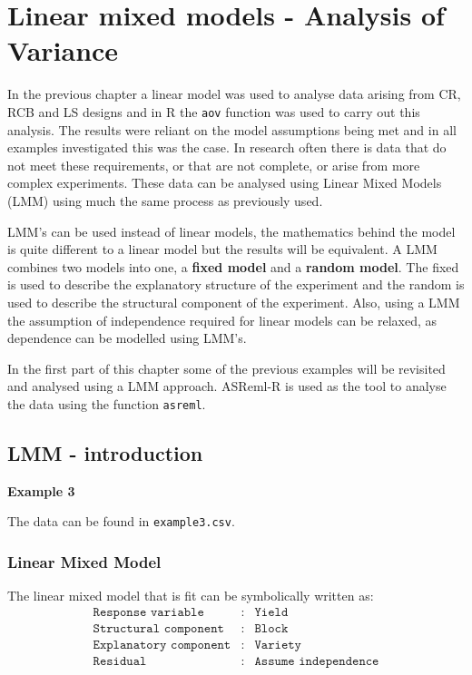 \documentclass[a4paper, 10pt, fleqn, twosided]{memoir}
\begin{document}
\clearpage


\chapter{Linear mixed models - Analysis of Variance}

In the previous chapter a linear model was used to analyse data arising from CR, RCB and LS designs and in R \cite{r}
the \texttt{aov} function was used to carry out this analysis. The results were reliant on the model assumptions being
met and in all examples investigated this was the case. In research often there is data that do not meet these
requirements, or that are not complete, or arise from more complex experiments. These data can be analysed using Linear
Mixed Models (LMM) using much the same process as previously used.

LMM's can be used instead of linear models, the mathematics behind the model is
quite different to a linear model but the results will be equivalent. A LMM
combines two models into one, a \textbf{fixed model} and a \textbf{random
model}. The fixed is used to describe the explanatory structure of the
experiment and the random is used to describe the structural component of the
experiment. Also, using a LMM the assumption of independence required for
linear models can be relaxed, as dependence can be modelled using LMM's.

In the first part of this chapter some of the previous examples will be revisited and analysed using a LMM approach.
ASReml-R \cite{asremlr} is used as the tool to analyse the data using the function \texttt{asreml}.

\section{LMM - introduction}

\textbf{Example 3}

The data can be found in  \texttt{example3.csv}.

\subsection{Linear Mixed Model}
The linear mixed model that is fit can be symbolically written as:
\begin{eqnarray*}
	\texttt{Response variable}&:& \texttt{Yield} \\
	\texttt{Structural component}&:& \texttt{Block}\\
	\texttt{Explanatory component}&:& \texttt{Variety}\\
	\texttt{Residual}&:& \texttt{Assume independence}
\end{eqnarray*}
\end{document}
